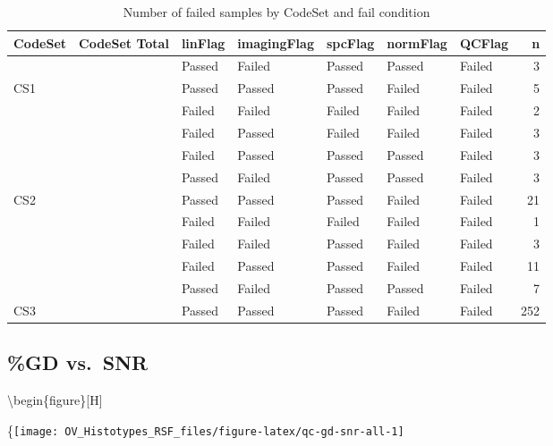 \documentclass[
]{report}
\begin{document}
\begin{table}

\caption{\label{tab:qc-failed}Number of failed samples by CodeSet and fail condition}
\centering
\begin{tabular}[t]{l|r|l|l|l|l|l|r}
\hline
CodeSet & CodeSet Total & linFlag & imagingFlag & spcFlag & normFlag & QCFlag & n\\
\hline
 &  & Passed & Failed & Passed & Passed & Failed & 3\\
\cline{3-8}
\multirow{-2}{*}{\raggedright\arraybackslash CS1} & \multirow{-2}{*}{\raggedleft\arraybackslash 8} & Passed & Passed & Passed & Failed & Failed & 5\\
\cline{1-8}
 &  & Failed & Failed & Failed & Failed & Failed & 2\\
\cline{3-8}
 &  & Failed & Passed & Failed & Failed & Failed & 3\\
\cline{3-8}
 &  & Failed & Passed & Passed & Passed & Failed & 3\\
\cline{3-8}
 &  & Passed & Failed & Passed & Passed & Failed & 3\\
\cline{3-8}
\multirow{-5}{*}{\raggedright\arraybackslash CS2} & \multirow{-5}{*}{\raggedleft\arraybackslash 32} & Passed & Passed & Passed & Failed & Failed & 21\\
\cline{1-8}
 &  & Failed & Failed & Failed & Failed & Failed & 1\\
\cline{3-8}
 &  & Failed & Failed & Passed & Failed & Failed & 3\\
\cline{3-8}
 &  & Failed & Passed & Passed & Failed & Failed & 11\\
\cline{3-8}
 &  & Passed & Failed & Passed & Passed & Failed & 7\\
\cline{3-8}
\multirow{-5}{*}{\raggedright\arraybackslash CS3} & \multirow{-5}{*}{\raggedleft\arraybackslash 274} & Passed & Passed & Passed & Failed & Failed & 252\\
\hline
\end{tabular}
\end{table}

\hypertarget{gd-vs.-snr}{%
\subsection{\%GD vs.~SNR}\label{gd-vs.-snr}}

\textbackslash begin\{figure\}{[}H{]}

\{\centering \texttt{[image: OV\_Histotypes\_RSF\_files/figure-latex/qc-gd-snr-all-1]}
\end{document}
